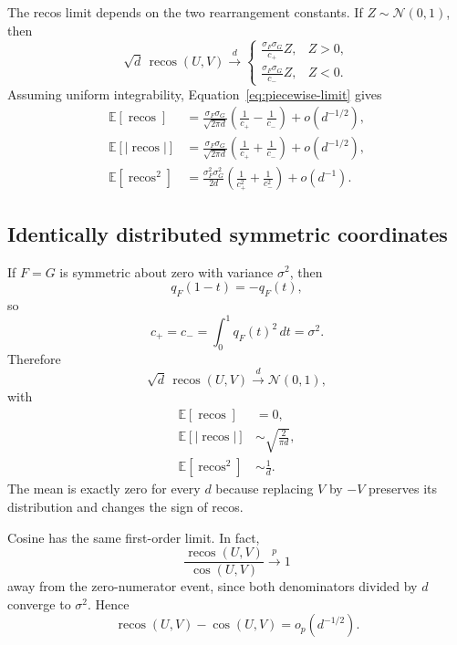 \documentclass[11pt,a4paper]{article}
\newcommand{\E}{\mathbb{E}}
\newcommand{\recos}{\operatorname{recos}}
\newcommand{\cosim}{\operatorname{cos}}
\begin{document}
The recos limit depends on the two rearrangement constants. If $Z\sim\mathcal{N}(0,1)$, then
\begin{equation}
    \sqrt{d}\,\recos(U,V)
    \xrightarrow{d}
    \begin{cases}
    \displaystyle \frac{\sigma_F\sigma_G}{c_+}Z,
    & Z>0,\\[0.8em]
    \displaystyle \frac{\sigma_F\sigma_G}{c_-}Z,
    & Z<0.
    \end{cases}
\label{eq:piecewise-limit}
\end{equation}
Assuming uniform integrability, Equation~\eqref{eq:piecewise-limit} gives
\begin{align}
    \E[\recos]
    &=
    \frac{\sigma_F\sigma_G}{\sqrt{2\pi d}}
    \left(\frac{1}{c_+}-\frac{1}{c_-}\right)
    +o(d^{-1/2}),\\
    \E[|\recos|]
    &=
    \frac{\sigma_F\sigma_G}{\sqrt{2\pi d}}
    \left(\frac{1}{c_+}+\frac{1}{c_-}\right)
    +o(d^{-1/2}),\\
    \E[\recos^2]
    &=
    \frac{\sigma_F^2\sigma_G^2}{2d}
    \left(\frac{1}{c_+^2}+\frac{1}{c_-^2}\right)
    +o(d^{-1}).
\end{align}

\subsection{Identically distributed symmetric coordinates}

If $F=G$ is symmetric about zero with variance $\sigma^2$, then
\begin{equation}
    q_F(1-t)=-q_F(t),
\end{equation}
so
\begin{equation}
    c_+=c_-=\int_0^1q_F(t)^2\,dt=\sigma^2.
\end{equation}
Therefore
\begin{equation}
    \sqrt{d}\,\recos(U,V)
    \xrightarrow{d}\mathcal{N}(0,1),
\end{equation}
with
\begin{align}
    \E[\recos]&=0,\\
    \E[|\recos|]&\sim\sqrt{\frac{2}{\pi d}},\\
    \E[\recos^2]&\sim\frac{1}{d}.
\end{align}
The mean is exactly zero for every $d$ because replacing $V$ by $-V$ preserves its distribution and changes the sign of recos.

Cosine has the same first-order limit. In fact,
\begin{equation}
    \frac{\recos(U,V)}{\cosim(U,V)}
    \xrightarrow{p}1
\end{equation}
away from the zero-numerator event, since both denominators divided by $d$ converge to $\sigma^2$. Hence
\begin{equation}
    \recos(U,V)-\cosim(U,V)=o_p(d^{-1/2}).
\end{equation}
\end{document}
